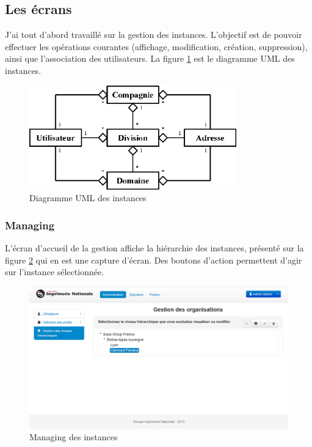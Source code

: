 
\subsection{Les écrans}

J'ai tout d'abord travaillé sur la gestion des instances.
L'objectif est de pouvoir effectuer les opérations courantes (affichage, modification, création, suppression), ainsi que l'association des utilisateurs.
La figure \ref{instances_UML} est le diagramme UML des instances.
\begin{figure}[!h]
	\center
	\includegraphics[width=0.8\textwidth]{img/instances_UML.png}
	\caption{Diagramme UML des instances}
	\label{instances_UML}
\end{figure}


\subsubsection{Managing}

L'écran d'accueil de la gestion affiche la hiérarchie des instances, présenté sur la figure \ref{instances_managing} qui en est une capture d'écran.
Des boutons d'action permettent d'agir sur l'instance sélectionnée.
\begin{figure}[!h]
	\center
	\includegraphics[width=1\textwidth]{img/instances_managing.png}
	\caption{Managing des instances}
	\label{instances_managing}
\end{figure}
~~\\

